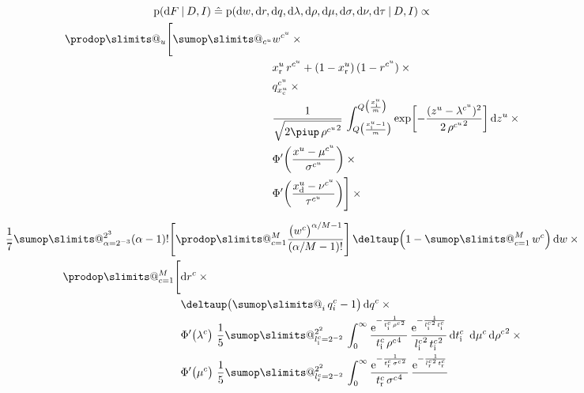 \documentclass[\ifafour a4paper,12pt,\else a5paper,10pt,\fi%
onecolumn,oneside,article,%
british%
]{memoir}
\makeatletter
\theoremstyle{remark}
\theoremstyle{innote}
\def\sum{\DOTSI\sumop\slimits@}
\def\prod{\DOTSI\prodop\slimits@}
\newcommand*{\pu}{\piup}%
\newcommand*{\delt}{\deltaup}%
\newcommand*{\e}{\ensuremath{\mathrm{e}}}
\newcommand*{\di}{\mathrm{d}}%
\newcommand*{\corr}{\mathrel{\hat{=}}}%
\newcommand*{\p}{\mathrm{p}}%
\renewcommand*{\|}[1][]{\nonscript\:#1\vert\nonscript\:\mathopen{}}
\newcommand*{\tsum}{\mathop{\textstyle\sum}\nolimits}
\newcommand*{\mur}{\mu}
\newcommand*{\sigmar}{\sigma}
\newcommand*{\mud}{\nu}
\newcommand*{\sigmad}{\tau}
\newcommand*{\mui}{\lambda}
\newcommand*{\sigmai}{\rho}
\newcommand*{\vr}{\textrm{r}}
\newcommand*{\vd}{\textrm{d}}
\newcommand*{\vi}{\textrm{i}}
\newcommand*{\vc}{\textrm{c}}
\makeatother
\begin{document}
\begin{table}\label{tab:posterior_F}
  \begin{multline}
    \label{eq:posterior_F_explicit}
    \p(\di F \| D, I) \corr
    \p(\di w, \di r, \di q,
    \di \lambda, \di \rho,
    \di \mu, \di \sigma,
    \di \nu, \di \tau
    \| D, I) \propto{}\\
    \begin{aligned}
      \prod_{u}\Biggl[
      \sum_{c^u}&
      w^{c^u}\times{}\\
      &x^{u}_{\vr}\, r^{c^u} + (1-x^{u}_{\vr})\,(1-r^{c^u}) \times{}\\
      &q^{c^u}_{x^{u}_{\vc}} \times{}\\
      &\frac{1}{\sqrt{2\pu\,{\sigmai^{c^u}}^{2}}}\,
      \int_{Q\bigl(\frac{x_{\vi}^{u}-1}{m}\bigr)}^{Q\bigl(\frac{x_{\vi}^{u}}{m}\bigr)}
      \exp\biggl[-\frac{(z^{u}-\mui^{c^u})^{2}}{2\,{\sigmai^{c^u}}^{2}}\biggr]\, \di z^{u}
      \times{}\\
      &\Phi'\biggl(\frac{x^{u}-\mur^{c^u}}{\sigmar^{c^u}}\biggr) \times{}\\
      &\Phi'\biggl(
      \frac{x_{\vd}^{u} - \mud^{c^u}}{\sigmad^{c^u}}
      \biggr)
      \Biggr]
      \times{}
    \end{aligned}
    \\[2\jot]
    \frac{1}{7}
    \sum_{\alpha=2^{-3}}^{2^{3}}
    (\alpha - 1)! \Biggl[\prod_{c=1}^{M}
    \frac{\bigl(w^{c}\bigr)^{\alpha/M-1}}{(\alpha/M -1)!} \Biggr]
    \, \delt\Bigl(1-\tsum_{c=1}^{M} w^{c}\Bigr)\,
    \di w
    \times{}\\
    \begin{aligned}[b]
      \prod_{c=1}^{M}\Biggl[&\di r^{c}
      \times{}\\
      &
      \delt\bigl(\tsum_{i}q^{c}_{i}-1\bigr)\,\di q^{c}
      \times{}\\
      & 
      \Phi'\bigl(\mui^{c}\bigr)\ 
      \frac{1}{5}\sum_{l_{\vi}^{c}=2^{-2}}^{2^{2}}\,
      \int_{0}^{\infty}
      \frac{\e^{-\frac{1}{t_{\vi}^{c}\,{\sigmai^{c}}^{2}}}}{
        t_{\vi}^{c}\,{\sigmai^{c}}^{4}
      }\,
      \frac{\e^{-\frac{1}{{l_{\vi}^{c}}^{2}\,t_{\vi}^{c}}}}{
        {l_{\vi}^{c}}^{2}\,{t_{\vi}^{c}}^{2}
      }\,\di t_{\vi}^{c}
      \enspace \di\mu^{c}\,\di{\sigmai^{c}}^{2}
      \times{}\\
      &
      \Phi'\bigl(\mur^{c}\bigr)\ 
      \frac{1}{5}\sum_{l_{\vr}^{c}=2^{-2}}^{2^{2}}\,
      \int_{0}^{\infty}
      \frac{\e^{-\frac{1}{t_{\vr}^{c}\,{\sigmar^{c}}^{2}}}}{
        t_{\vr}^{c}\,{\sigmar^{c}}^{4}
      }\,
      \frac{\e^{-\frac{1}{{l_{\vr}^{c}}^{2}\,t_{\vr}^{c}}}}{
}
\end{aligned}
\end{multline}
\end{table}
\end{document}

